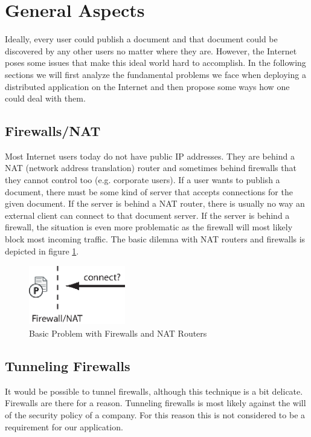 \section{General Aspects}
Ideally, every user could publish a document and that document could be discovered by any other users no matter where they are. However, the Internet poses some issues that make this ideal world hard to accomplish. In the following sections we will first analyze the fundamental problems we face when deploying a distributed application on the Internet and then propose some ways how one could deal with them.

\subsection{Firewalls/NAT}
Most Internet users today do not have public IP addresses. They are behind a NAT (network address translation) router and sometimes behind firewalls that they cannot control too (e.g. corporate users). If a user wants to publish a document, there must be some kind of server that accepts connections for the given document. If the server is behind a NAT router, there is usually no way an external client can connect to that document server. If the server is behind a firewall, the situation is even more problematic as the firewall will most likely block most incoming traffic. The basic dilemna with NAT routers and firewalls is depicted in figure \ref{fig:firewall}.

\begin{figure}[H]
 \centering
 \includegraphics[width=4.2cm,height=2.6cm]{../../images/net_firewall.eps}
 \caption{Basic Problem with Firewalls and NAT Routers}
 \label{fig:firewall}
\end{figure}

\subsection{Tunneling Firewalls}
It would be possible to tunnel firewalls, although this technique is a bit delicate. Firewalls are there for a reason. Tunneling firewalls is most likely against the will of the security policy of a company. For this reason this is not considered to be a requirement for our application.

